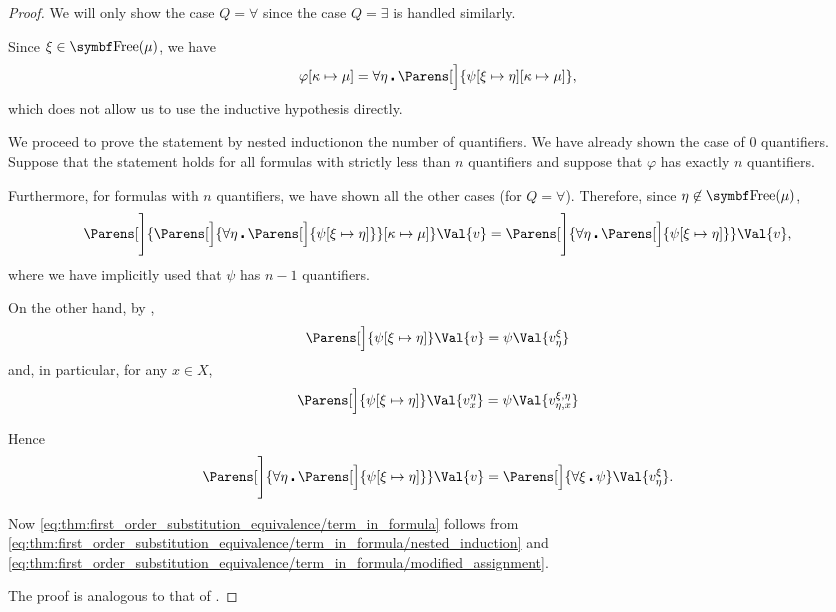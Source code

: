 \begin{proof}
  We will only show the case \( Q = \forall \) since the case \( Q = \exists \) is handled similarly.

  Since \( \xi \in \Bold{Free}(\mu) \), we have
  \begin{equation*}
    \varphi[\kappa \mapsto \mu]
    =
    \forall \eta \centerdot \Parens[\Big]{ \psi[\xi \mapsto \eta][\kappa \mapsto \mu] },
  \end{equation*}
  which does not allow us to use the inductive hypothesis directly.

  We proceed to prove the statement by nested induction\IND on the number of quantifiers. We have already shown the case of \( 0 \) quantifiers. Suppose that the statement holds for all formulas with strictly less than \( n \) quantifiers and suppose that \( \varphi \) has exactly \( n \) quantifiers.

  Furthermore, for formulas with \( n \) quantifiers, we have shown all the other cases (for \( Q = \forall \)). Therefore, since \( \eta \not\in \Bold{Free}(\mu) \),
  \begin{equation}\label{eq:thm:first_order_substitution_equivalence/term_in_formula/nested_induction}
    \Parens[\Bigg]{ \Parens[\Big]{ \forall \eta \centerdot \Parens[\Big]{ \psi[\xi \mapsto \eta] } }[\kappa \mapsto \mu] }\Val{v}
    =
    \Parens[\Bigg]{\forall \eta \centerdot \Parens[\Big]{ \psi[\xi \mapsto \eta] } }\Val{v},
  \end{equation}
  where we have implicitly used that \( \psi \) has \( n - 1 \) quantifiers.

  On the other hand, by ,
  \begin{equation*}
    \Parens[\Big]{ \psi[\xi \mapsto \eta] }\Val{v} = \psi\Val{v_\eta^\xi}
  \end{equation*}
  and, in particular, for any \( x \in X \),
  \begin{equation*}
    \Parens[\Big]{ \psi[\xi \mapsto \eta] }\Val{v_x^\eta} = \psi\Val{v_{\eta,x}^{\xi,\eta}}
  \end{equation*}

  Hence
  \begin{equation}\label{eq:thm:first_order_substitution_equivalence/term_in_formula/modified_assignment}
    \Parens[\Bigg]{\forall \eta \centerdot \Parens[\Big]{ \psi[\xi \mapsto \eta] } }\Val{v}
    =
    \Parens[\Big]{\forall \xi \centerdot \psi }\Val{v_\eta^\xi}.
  \end{equation}

  Now \eqref{eq:thm:first_order_substitution_equivalence/term_in_formula} follows from \eqref{eq:thm:first_order_substitution_equivalence/term_in_formula/nested_induction} and \eqref{eq:thm:first_order_substitution_equivalence/term_in_formula/modified_assignment}.

   The proof is analogous to that of .
\end{proof}
